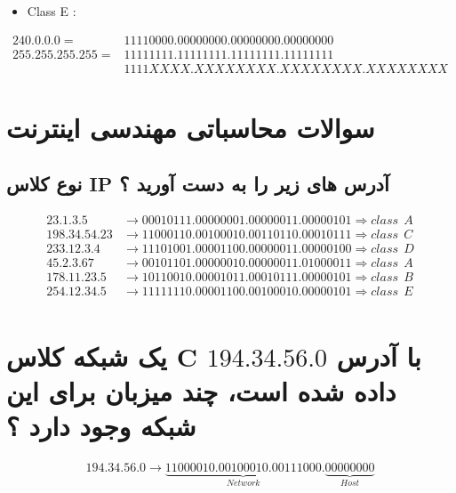 \documentclass{article}
\begin{document}
\begin{latin}
\begin{itemize}
	\item Class E :
\end{itemize}
\end{latin}
\begin{align*}
240.  0.  0.  0 = &11110000.00000000.00000000.00000000 \\
255.255.255.255 = &11111111.11111111.11111111.11111111 \\
                  &1111XXXX.XXXXXXXX.XXXXXXXX.XXXXXXXX
\end{align*}


\section{سوالات محاسباتی مهندسی اینترنت}

\subsection{نوع کلاس IP آدرس های زیر را به دست آورید ؟}

\begin{align*}
23.1.3.5 &\to 00010111.00000001.00000011.00000101 \Rightarrow class \:\: A \\
198.34.54.23 &\to 11000110.00100010.00110110.00010111 \Rightarrow class \:\: C \\
233.12.3.4 &\to 11101001.00001100.00000011.00000100  \Rightarrow class \:\: D \\
45.2.3.67 &\to 00101101.00000010.00000011.01000011  \Rightarrow class \:\: A \\
178.11.23.5 &\to 10110010.00001011.00010111.00000101 \Rightarrow class \:\: B \\
254.12.34.5 &\to 11111110.00001100.00100010.00000101 \Rightarrow class \:\: E \\
\end{align*}





\section{یک شبکه کلاس C با آدرس 
$
194.34.56.0
$
داده شده است، چند میزبان برای  این شبکه وجود دارد ؟ 
}

\begin{align*}
194.34.56.0 \to \underbrace{11000010.00100010.00111000}_{Network}.\underbrace{00000000}_{Host}
\end{align*}
\end{document}
